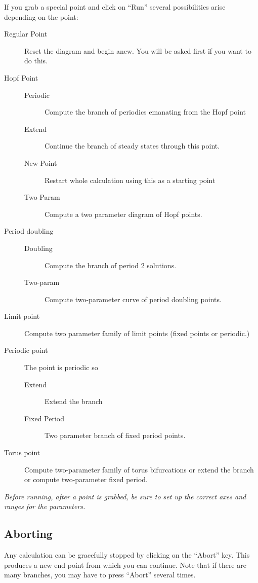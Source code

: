 \documentclass{article}
\begin{document}
If you grab a special point and click on ``Run'' several possibilities
arise depending on the point:
\begin{description}
\item[Regular Point] Reset the diagram and begin anew.  You will be
asked first if you want to do this.
\item[Hopf Point]  
\begin{description}
	\item[Periodic] Compute the branch of periodics emanating from
the Hopf point
	\item[Extend] Continue the branch of steady states through
this point.
	\item[New Point] Restart whole calculation using this as a
starting point
	\item[Two Param] Compute a two parameter diagram of Hopf
points. 
	\end{description}
\item[Period doubling] 
	\begin{description}
	\item[Doubling] Compute the branch of period 2 solutions.
	\item[Two-param]  Compute two-parameter curve of period
doubling points.
	\end{description}
 
\item[Limit point] Compute two parameter family of limit points (fixed
points or periodic.) 
\item[Periodic point] The point is periodic so
	\begin{description}
	\item[Extend] Extend the branch
	\item[Fixed Period] Two parameter branch of fixed period
points. 
	\end{description}
	
\item[Torus point]  Compute two-parameter family of torus
bifurcations or extend the branch or compute two-parameter
fixed period.

\end{description}

{\em Before running, after a point is grabbed, be sure to set up the
correct axes and ranges for the parameters.}

\subsection{Aborting}
Any calculation can be gracefully stopped by clicking on the ``Abort''
key. This produces a new end point from which you can continue.  Note
that if there are many branches, you may have to press ``Abort''
several times. 
\end{document}
